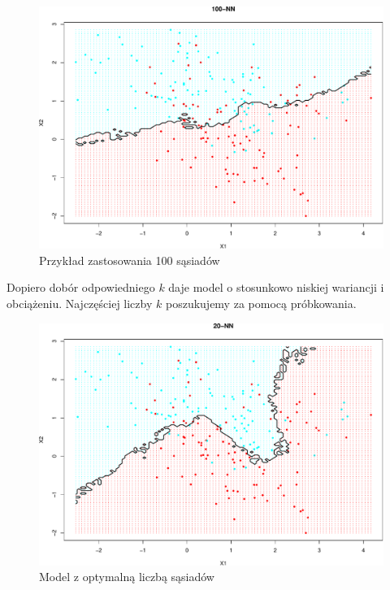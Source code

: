 \documentclass[
]{book}
\theoremstyle{plain}
\theoremstyle{definition}
\theoremstyle{definition}
\theoremstyle{definition}
\theoremstyle{definition}
\theoremstyle{remark}
\begin{document}
\begin{figure}

{\centering \includegraphics{EksploracjaDanych_files/figure-latex/knn2-1} 

}

\caption{Przykład zastosowania 100 sąsiadów}\label{fig:knn2}
\end{figure}

Dopiero dobór odpowiedniego \(k\) daje model o stosunkowo niskiej wariancji i obciążeniu. Najczęściej liczby \(k\) poszukujemy za pomocą próbkowania.

\begin{figure}

{\centering \includegraphics{EksploracjaDanych_files/figure-latex/knn3-1} 

}

\caption{Model z optymalną liczbą sąsiadów}\label{fig:knn3}
\end{figure}
\end{document}
